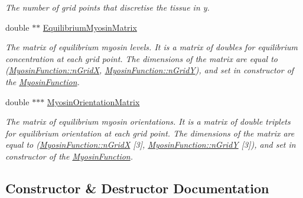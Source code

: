 \begin{DoxyCompactItemize}
\begin{DoxyCompactList}\small\item\em The number of grid points that discretise the tissue in y. \end{DoxyCompactList}\item 
\hypertarget{classMyosinFunction_a7332175e6d9369c02a8c569f000211e1}{}double $\ast$$\ast$ \hyperlink{classMyosinFunction_a7332175e6d9369c02a8c569f000211e1}{Equilibrium\+Myosin\+Matrix}\label{classMyosinFunction_a7332175e6d9369c02a8c569f000211e1}

\begin{DoxyCompactList}\small\item\em The matrix of equilibrium myosin levels. It is a matrix of doubles for equilibrium concentration at each grid point. The dimensions of the matrix are equal to (\hyperlink{classMyosinFunction_a36ac0b5ce87011878a7f1954e270e5ae}{Myosin\+Function\+::n\+Grid\+X}, \hyperlink{classMyosinFunction_a1652a8a0d154b136434bee037e0262a4}{Myosin\+Function\+::n\+Grid\+Y}), and set in constructor of the \hyperlink{classMyosinFunction}{Myosin\+Function}. \end{DoxyCompactList}\item 
\hypertarget{classMyosinFunction_a171909633b0117031045287fdbc401db}{}double $\ast$$\ast$$\ast$ \hyperlink{classMyosinFunction_a171909633b0117031045287fdbc401db}{Myosin\+Orientation\+Matrix}\label{classMyosinFunction_a171909633b0117031045287fdbc401db}

\begin{DoxyCompactList}\small\item\em The matrix of equilibrium myosin orientations. It is a matrix of double triplets for equilibrium orientation at each grid point. The dimensions of the matrix are equal to (\hyperlink{classMyosinFunction_a36ac0b5ce87011878a7f1954e270e5ae}{Myosin\+Function\+::n\+Grid\+X} \mbox{[}3\mbox{]}, \hyperlink{classMyosinFunction_a1652a8a0d154b136434bee037e0262a4}{Myosin\+Function\+::n\+Grid\+Y} \mbox{[}3\mbox{]}), and set in constructor of the \hyperlink{classMyosinFunction}{Myosin\+Function}. \end{DoxyCompactList}\end{DoxyCompactItemize}


\subsection{Constructor \& Destructor Documentation}
\hypertarget{classMyosinFunction_a25c83e1aaafc9d029e6c551008114ef7}{}
